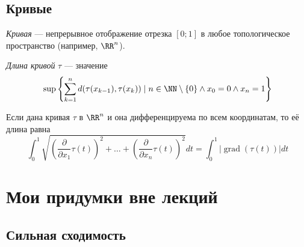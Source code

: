 \documentclass[12pt,a4paper]{article}
\DeclareMathOperator{\grad}{grad}
\begin{document}

    \subsection{Кривые}

    \begin{definition}
        \emph{Кривая} --- непрерывное отображение отрезка $[0; 1]$ в любое топологическое пространство (например, $\RR^n$). 
    \end{definition}


    \begin{definition}
        \emph{Длина кривой} $\tau$ --- значение
        \[\sup \left\{\sum_{k=1}^n d(\tau(x_{k-1}), \tau(x_k)) \mid n \in \NN \setminus \{0\} \wedge x_0 = 0 \wedge x_n = 1\right\}\]
    \end{definition}

    \begin{statement}
        Если дана кривая $\tau$ в $\RR^n$ и она дифференцируема по всем координатам, то её длина равна
        \[
            \int_0^1 \sqrt{\left(\frac{\partial}{\partial x_1} \tau(t)\right)^2 + \dots + \left(\frac{\partial}{\partial x_n} \tau(t)\right)^2} dt
            = \int_0^1 |\grad(\tau(t))| dt
        \]
    \end{statement}

    \newpage\null\thispagestyle{empty}\newpage
    \section{Мои придумки вне лекций}

    \subsection{Сильная сходимость}
\end{document}
